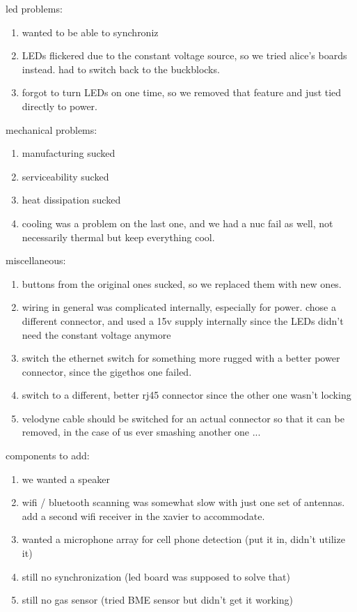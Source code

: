 led problems:
\begin{enumerate}
	\item wanted to be able to synchroniz
	\item LEDs flickered due to the constant voltage source, so we tried alice's boards instead. had to switch back to the buckblocks.
	\item forgot to turn LEDs on one time, so we removed that feature and just tied directly to power.
\end{enumerate}

mechanical problems:
\begin{enumerate}
	\item manufacturing sucked
	\item serviceability sucked
	\item heat dissipation sucked
	\item cooling was a problem on the last one, and we had a nuc fail as well, not necessarily thermal but keep everything cool.
\end{enumerate}

miscellaneous:
\begin{enumerate}
	\item buttons from the original ones sucked, so we replaced them with new ones.
	\item wiring in general was complicated internally, especially for power. chose a different connector,  and used a 15v supply internally since the LEDs didn't need the constant voltage anymore
	\item switch the ethernet switch for something more rugged with a better power connector, since the gigethos one failed.
	\item switch to a different, better rj45 connector since the other one wasn't locking
	\item velodyne cable should be switched for an actual connector so that it can be removed, in the case of us ever smashing another one ...
\end{enumerate}

components to add:
\begin{enumerate}
	\item we wanted a speaker
	\item wifi / bluetooth scanning was somewhat slow with just one set of antennas. add a second wifi receiver in the xavier to accommodate.
	\item wanted a microphone array for cell phone detection (put it in, didn't utilize it)
	\item still no synchronization (led board was supposed to solve that)
	\item still no gas sensor (tried BME sensor but didn't get it working)	
\end{enumerate}



